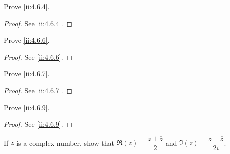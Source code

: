 \exercisesection

\begin{ex}\label{ii:ex:4.6.1}
  Prove \cref{ii:4.6.4}.
\end{ex}

\begin{proof}
  See \cref{ii:4.6.4}.
\end{proof}

\begin{ex}\label{ii:ex:4.6.2}
  Prove \cref{ii:4.6.6}.
\end{ex}

\begin{proof}
  See \cref{ii:4.6.6}.
\end{proof}

\begin{ex}\label{ii:ex:4.6.3}
  Prove \cref{ii:4.6.7}.
\end{ex}

\begin{proof}
  See \cref{ii:4.6.7}.
\end{proof}

\begin{ex}\label{ii:ex:4.6.4}
  Prove \cref{ii:4.6.9}.
\end{ex}

\begin{proof}
  See \cref{ii:4.6.9}.
\end{proof}

\begin{ex}\label{ii:ex:4.6.5}
  If \(z\) is a complex number, show that \(\Re(z) = \dfrac{z + \overline{z}}{2}\) and \(\Im(z) = \dfrac{z - \overline{z}}{2i}\).
\end{ex}

